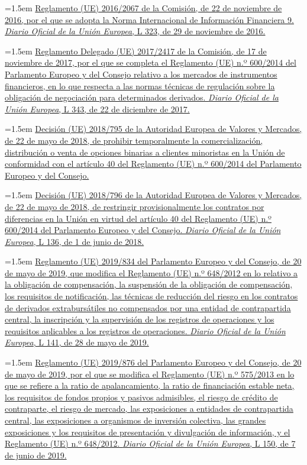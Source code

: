 \documentclass[10pt,a4paper]{article}
\begin{document}
\noindent\hangindent=1.5em \href{https://eur-lex.europa.eu/eli/reg/2016/2067/oj}{Reglamento (UE) 2016/2067 de la Comisión, de 22 de noviembre de 2016, por el que se adopta la Norma Internacional de Información Financiera 9. \textit{Diario Oficial de la Unión Europea}, L 323, de 29 de noviembre de 2016.}

\noindent\hangindent=1.5em \href{https://eur-lex.europa.eu/eli/reg_del/2017/2417/oj}{Reglamento Delegado (UE) 2017/2417 de la Comisión, de 17 de noviembre de 2017, por el que se completa el Reglamento (UE) n.º 600/2014 del Parlamento Europeo y del Consejo relativo a los mercados de instrumentos financieros, en lo que respecta a las normas técnicas de regulación sobre la obligación de negociación para determinados derivados. \textit{Diario Oficial de la Unión Europea}, L 343, de 22 de diciembre de 2017.}

\noindent\hangindent=1.5em \href{https://eur-lex.europa.eu/eli/dec/2018/795/oj}{Decisión (UE) 2018/795 de la Autoridad Europea de Valores y Mercados, de 22 de mayo de 2018, de prohibir temporalmente la comercialización, distribución o venta de opciones binarias a clientes minoristas en la Unión de conformidad con el artículo 40 del Reglamento (UE) n.º 600/2014 del Parlamento Europeo y del Consejo.}

\noindent\hangindent=1.5em \href{https://eur-lex.europa.eu/eli/dec/2018/796/oj}{Decisión (UE) 2018/796 de la Autoridad Europea de Valores y Mercados, de 22 de mayo de 2018, de restringir provisionalmente los contratos por diferencias en la Unión en virtud del artículo 40 del Reglamento (UE) n.º 600/2014 del Parlamento Europeo y del Consejo. \textit{Diario Oficial de la Unión Europea}, L 136, de 1 de junio de 2018.}

\noindent\hangindent=1.5em \href{https://eur-lex.europa.eu/eli/reg/2019/834/oj}{Reglamento (UE) 2019/834 del Parlamento Europeo y del Consejo, de 20 de mayo de 2019, que modifica el Reglamento (UE) n.º 648/2012 en lo relativo a la obligación de compensación, la suspensión de la obligación de compensación, los requisitos de notificación, las técnicas de reducción del riesgo en los contratos de derivados extrabursátiles no compensados por una entidad de contrapartida central, la inscripción y la supervisión de los registros de operaciones y los requisitos aplicables a los registros de operaciones. \textit{Diario Oficial de la Unión Europea}, L 141, de 28 de mayo de 2019.}

\noindent\hangindent=1.5em \href{https://eur-lex.europa.eu/eli/reg/2019/876/oj}{Reglamento (UE) 2019/876 del Parlamento Europeo y del Consejo, de 20 de mayo de 2019, por el que se modifica el Reglamento (UE) n.º 575/2013 en lo que se refiere a la ratio de apalancamiento, la ratio de financiación estable neta, los requisitos de fondos propios y pasivos admisibles, el riesgo de crédito de contraparte, el riesgo de mercado, las exposiciones a entidades de contrapartida central, las exposiciones a organismos de inversión colectiva, las grandes exposiciones y los requisitos de presentación y divulgación de información, y el Reglamento (UE) n.º 648/2012. \textit{Diario Oficial de la Unión Europea}, L 150, de 7 de junio de 2019.}
\end{document}
